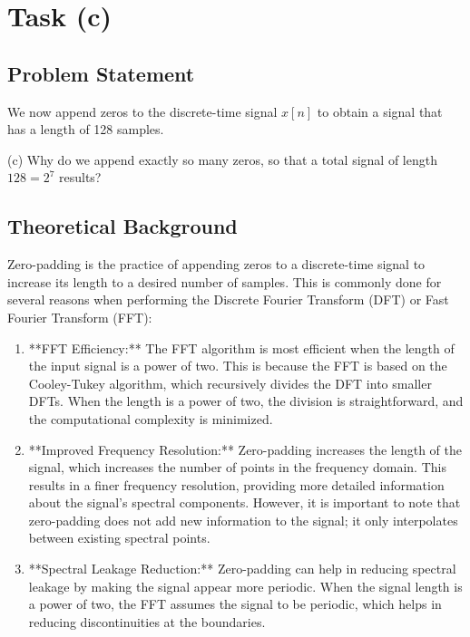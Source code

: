 \item[(c)]
\section*{Task (c)}

\subsection*{Problem Statement}
We now append zeros to the discrete-time signal \( x[n] \) to obtain a signal that has a length of 128 samples.

(c) Why do we append exactly so many zeros, so that a total signal of length \( 128 = 2^7 \) results?

\subsection*{Theoretical Background}
Zero-padding is the practice of appending zeros to a discrete-time signal to increase its length to a desired number of samples. This is commonly done for several reasons when performing the Discrete Fourier Transform (DFT) or Fast Fourier Transform (FFT):

\begin{enumerate}
    \item **FFT Efficiency:**
    The FFT algorithm is most efficient when the length of the input signal is a power of two. This is because the FFT is based on the Cooley-Tukey algorithm, which recursively divides the DFT into smaller DFTs. When the length is a power of two, the division is straightforward, and the computational complexity is minimized.

    \item **Improved Frequency Resolution:**
    Zero-padding increases the length of the signal, which increases the number of points in the frequency domain. This results in a finer frequency resolution, providing more detailed information about the signal's spectral components. However, it is important to note that zero-padding does not add new information to the signal; it only interpolates between existing spectral points.

    \item **Spectral Leakage Reduction:**
    Zero-padding can help in reducing spectral leakage by making the signal appear more periodic. When the signal length is a power of two, the FFT assumes the signal to be periodic, which helps in reducing discontinuities at the boundaries.
\end{enumerate}

